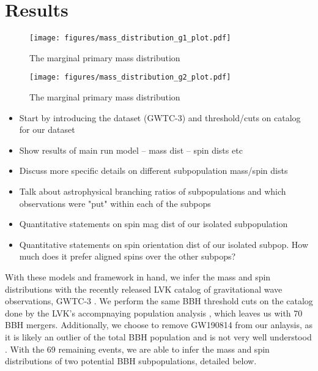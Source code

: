 \section{Results} \label{sec:results}

\begin{figure*}[ht!]
    \begin{centering}
        \texttt{[image: figures/mass\_distribution\_g1\_plot.pdf]}
        \caption{The marginal primary mass distribution}
        \label{fig:g1_mass_distribution}
    \end{centering}
\end{figure*}

\begin{figure*}[ht!]
    \begin{centering}
        \texttt{[image: figures/mass\_distribution\_g2\_plot.pdf]}
        \caption{The marginal primary mass distribution}
        \label{fig:g2_mass_distribution}
    \end{centering}
\end{figure*}


\begin{itemize}
    \item Start by introducing the dataset (GWTC-3) and threshold/cuts on catalog for our dataset
    \item Show results of main run model -- mass dist -- spin dists etc
    \item Discuss more specific details on different subpopulation mass/spin dists
    \item Talk about astrophysical branching ratios of subpopulations and which observations were "put" within each of the subpops
    \item Quantitative statements on spin mag dist of our isolated subpopulation
    \item Quantitative statements on spin orientation dist of our isolated subpop. How much does it prefer aligned spins over the other subpops?
\end{itemize}

With these models and framework in hand, we infer the mass and spin distributions with the recently released LVK catalog of gravitational wave observations, GWTC-3 \citet{2021arXiv211103606T}. We perform the same BBH threshold cuts on the catalog done by the LVK's accompnaying population analysis \othreea{}, which leaves us with 70 BBH mergers. Additionally, we choose to remove GW190814 from our anlaysis, as it is likely an outlier of the total BBH population and is not very well understood . With the 69 remaining events, we are able to infer the mass and spin distributions of two potential BBH subpopulations, detailed below. 

